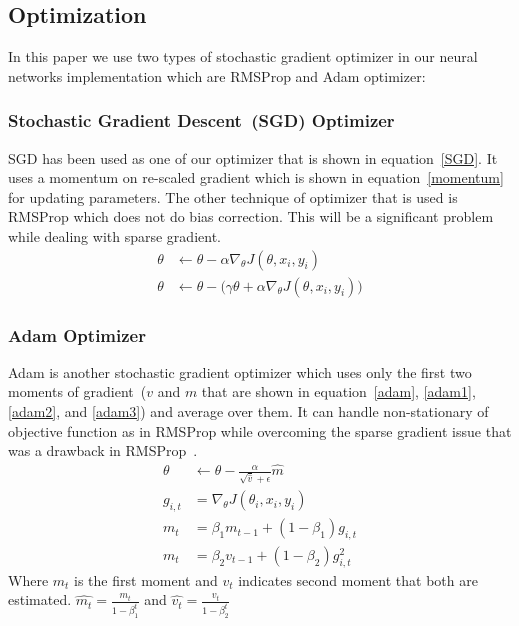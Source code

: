 \documentclass[sigconf, final]{acmart}
\begin{document}
\subsection{Optimization}\label{subsec:Optimization}
In this paper we use two types of stochastic gradient optimizer in our neural networks implementation which are RMSProp  and Adam optimizer:
\subsubsection{Stochastic Gradient Descent~(SGD) Optimizer}
SGD has been used as one of our optimizer that is shown in equation~\ref{SGD}. It uses a momentum on re-scaled gradient which is shown in equation~\ref{momentum} for updating parameters. The other technique of optimizer that is used is RMSProp which does not do bias correction. This will be a significant problem while dealing with sparse gradient. 
\begin{align}
\label{SGD}
\theta &\leftarrow \theta - \alpha \nabla_\theta J(\theta , x_i,y_i)\\
\label{momentum}
\theta &\leftarrow \theta -\big( \gamma \theta + \alpha \nabla_\theta J(\theta , x_i,y_i)\big)
\end{align}
\subsubsection{Adam Optimizer}
Adam is another stochastic gradient optimizer which uses only the first two moments of gradient~($v$ and $m$ that are shown in equation~\ref{adam},   \ref{adam1}, \ref{adam2}, and \ref{adam3}) and average over them. It can handle non-stationary of objective function as in RMSProp while overcoming the sparse gradient issue that was a drawback in RMSProp~\cite{kingma2014adam}.
\begin{align}
\label{adam}
\theta & \leftarrow \theta - \frac{\alpha}{\sqrt{\hat{v}}+\epsilon} \hat{m}\\
g_{i,t} &=  \nabla_\theta J(\theta_i , x_i,y_i) \label{adam1}\\
\label{adam2}
m_t &= \beta_1 m_{t-1} + (1-\beta_1)g_{i,t}\\
\label{adam3}
m_t &= \beta_2 v_{t-1} + (1-\beta_2)g_{i,t}^2
\end{align}
Where $m_t$ is the first moment and $v_t$ indicates second moment that both are estimated. $\hat{m_t}=\frac{m_t}{1-\beta_1^t}$ and $\hat{v_t}=\frac{v_t}{1-\beta_2^t}$
\end{document}
